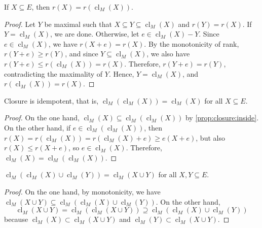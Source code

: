 \begin{proposition} \label{prop:closure:rank}
    If \(X \subseteq E\), then \(r(X) = r(\operatorname{cl}_M(X))\).
\end{proposition}

\begin{proof}
    Let \(Y\) be maximal such that \(X \subseteq Y \subseteq \operatorname{cl}_M(X)\) and \(r(Y) = r(X)\).
    If \(Y = \operatorname{cl}_M(X)\), we are done.
    Otherwise, let \(e \in \operatorname{cl}_M(X) - Y\).
    Since \(e \in \operatorname{cl}_M(X)\), we have \(r(X + e) = r(X)\).
    By the monotonicity of rank, \(r(Y + e) \geq r(Y)\), and since \(Y \subseteq \operatorname{cl}_M(X)\), we also have \(r(Y + e) \leq r(\operatorname{cl}_M(X)) = r(X)\).
    Therefore, \(r(Y + e) = r(Y)\), contradicting the maximality of \(Y\).
    Hence, \(Y = \operatorname{cl}_M(X)\), and \(r(\operatorname{cl}_M(X)) = r(X)\).
\end{proof}

\begin{proposition} \label{prop:closure:idempotent}
    Closure is idempotent,
    that is,
    \(\operatorname{cl}_M(\operatorname{cl}_M(X)) = \operatorname{cl}_M(X)\) for all \(X \subseteq E\).
\end{proposition}

\begin{proof}
    On the one hand, \(\operatorname{cl}_M(X) \subseteq \operatorname{cl}_M(\operatorname{cl}_M(X))\) by \ref{prop:closure:inside}.
    On the other hand, if \(e \in \operatorname{cl}_M(\operatorname{cl}_M(X))\),
    then \(r(X) = r(\operatorname{cl}_M(X)) = r(\operatorname{cl}_M(X) + e) \geq e(X + e)\),
    but also \(r(X) \leq r(X + e)\), so \(e \in \operatorname{cl}_M(X)\).
    Therefore, \(\operatorname{cl}_M(X) = \operatorname{cl}_M(\operatorname{cl}_M(X))\).
\end{proof}

\begin{proposition} \label{prop:closure:union}
    \(\operatorname{cl}_M( \operatorname{cl}_M(X) \cup \operatorname{cl}_M(Y) ) = \operatorname{cl}_M(X \cup Y)\) for all \(X, Y \subseteq E\).
\end{proposition}

\begin{proof}
    On the one hand, by monotonicity, we have \( \operatorname{cl}_M(X \cup Y) \subseteq \operatorname{cl}_M( \operatorname{cl}_M(X) \cup \operatorname{cl}_M(Y) )\).
    On the other hand, 
    \begin{equation}
        \operatorname{cl}_M( X \cup Y ) = \operatorname{cl}_M( \operatorname{cl}_M( X \cup Y ) ) \supseteq \operatorname{cl}_M( \operatorname{cl}_M(X) \cup \operatorname{cl}_M(Y) )
    \end{equation}
    because \(\operatorname{cl}_M(X) \subset \operatorname{cl}_M(X \cup Y)\) and \(\operatorname{cl}_M(Y) \subset \operatorname{cl}_M(X \cup Y)\).
\end{proof}

